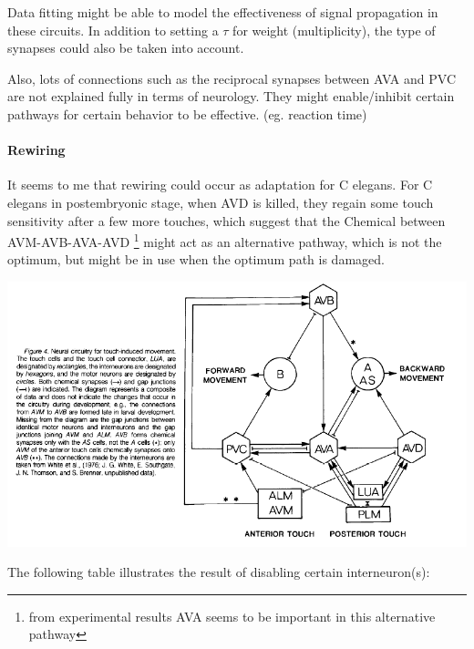 Data fitting might be able to model the effectiveness of signal propagation in these circuits. In addition to setting a $\tau$ for weight (multiplicity), the type of
synapses could also be taken into account.

Also, lots of connections such as the reciprocal synapses between AVA and PVC are not explained fully in terms of neurology. They might enable/inhibit certain pathways
for certain behavior to be effective. (eg. reaction time)

\paragraph{Rewiring} It seems to me that rewiring could occur as adaptation for C elegans. For C elegans in postembryonic stage, when AVD is killed, they regain some
touch sensitivity after a few more touches, which suggest that the Chemical between AVM-AVB-AVA-AVD \footnote{from experimental results AVA seems to be important in this
alternative pathway} might act as an alternative pathway, which is not the optimum, but might be in
use when the optimum path is damaged.

\includegraphics[scale=0.8]{graphics/TouchCircuit}

The following table illustrates the result of disabling certain interneuron(s):

